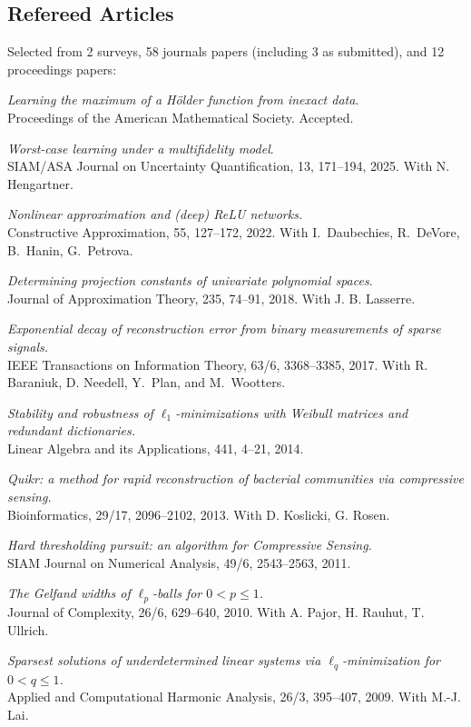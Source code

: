 \documentclass[11pt]{article}
\begin{document}
\subsection{Refereed Articles}
Selected from 2 surveys, 58 journals papers (including 3 as submitted), and 12 proceedings papers:
\betaremune
\item {\sl Learning the maximum of a H\"older function from inexact data}.\\
Proceedings of the American Mathematical Society.
Accepted.
\item {\sl Worst-case learning under a multifidelity model}.\\
SIAM/ASA Journal on Uncertainty Quantification, 13, 171--194, 2025. With N. Hengartner.
\item {\sl Nonlinear approximation and (deep) ReLU networks.}\\
Constructive Approximation,  55, 127--172, 2022.
With I.~Daubechies, R.~DeVore, B.~Hanin, G.~Petrova.
\item {\sl Determining projection constants of univariate polynomial spaces}.\\
Journal of Approximation Theory, 235, 74--91, 2018.
With J. B. Lasserre.
\item {\sl Exponential decay of reconstruction error from binary measurements of sparse signals.}\\
IEEE Transactions on Information Theory, 63/6, 3368--3385, 2017.
With R. Baraniuk, D. Needell, Y.~Plan, and \mbox{M.~Wootters}.
\item {\sl Stability and robustness of $\ell_1$-minimizations with Weibull matrices and redundant dictionaries.}\\
Linear Algebra and its Applications, 441, 4--21, 2014.
\item {\sl Quikr: a method for rapid reconstruction of bacterial communities via compressive sensing.}\\
Bioinformatics, 29/17, 2096--2102, 2013. 
With D. Koslicki, G. Rosen.
\item {\sl Hard thresholding pursuit: an algorithm for Compressive Sensing.}\\
SIAM Journal on Numerical Analysis, 49/6, 2543--2563, 2011.
\item {\sl The Gelfand widths of $\ell_p$-balls for $0<p \le 1$.}\\
Journal of Complexity, 26/6, 629--640, 2010. 
With A. Pajor, H. Rauhut, T. Ullrich.
\item {\sl  Sparsest solutions of underdetermined linear systems via $\ell_q$-minimization for $0 <  q  \le  1$.}\\
Applied and Computational Harmonic Analysis, 26/3, 395--407, 2009. 
With M.-J. Lai.
\eetaremune
\end{document}
